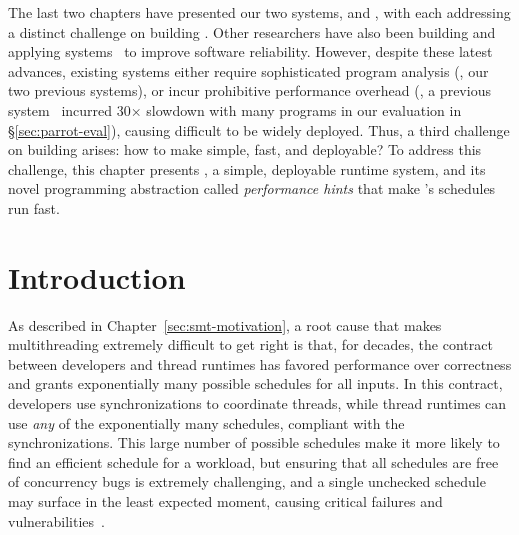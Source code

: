 The last two chapters have presented our two systems, \tern and \peregrine,  
with each addressing a distinct challenge on building \smt. Other 
researchers have also been building and applying \smt 
systems~\cite{determinator:osdi10, dthreads:sosp11, bergan:oopsla13} to improve 
software reliability. However, despite these latest advances, existing \smt 
systems either require sophisticated program analysis (\eg, our two previous 
systems), or incur prohibitive performance overhead (\eg, a previous 
system~\cite{dthreads:sosp11} incurred 30$\times$ slowdown with many programs 
in our evaluation in \S\ref{sec:parrot-eval}), causing \smt difficult to be 
widely deployed. Thus, a third challenge on building \smt arises: how to make 
\smt simple, fast, and deployable? To address this challenge, this chapter 
presents \parrot, a simple, deployable \smt runtime system, and its 
novel programming abstraction called \emph{performance hints} that make 
\parrot's schedules run fast.

\section{Introduction} \label{sec:parrot-intro}

As described in Chapter~\ref{sec:smt-motivation}, a root cause that makes 
multithreading extremely difficult to get right
is that, for decades, the contract between developers and thread runtimes has 
favored performance over correctness and grants exponentially many possible 
schedules for all inputs.  In this contract, developers use 
synchronizations to coordinate threads, while thread runtimes can
use \emph{any} of the exponentially many schedules, 
compliant with the synchronizations.  This large number of possible schedules 
make it more likely to find an efficient schedule for a workload, but ensuring
that all schedules are free of concurrency bugs is extremely challenging, and a 
single unchecked schedule may surface in the least expected moment, causing 
critical failures and vulnerabilities~\cite{therac25-investigation, 
northeast-blackout, lu:concurrency-bugs,con:hotpar12}.

